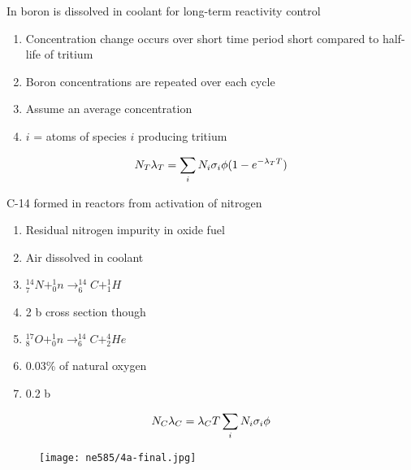 \documentclass[aspectratio=1610,pdftex,dvipsnames,compress,xcolor={dvipsnames}]{beamer}
\newcommand{\acsp}{\acrshortpl} %
\begin{document}
\begin{frame}{In \acsp{pwr} boron is dissolved in coolant for long-term reactivity control}
    \begin{enumerate}[series=outerlist,topsep=0pt,itemsep=21pt,leftmargin=*,label=(\arabic*)]
        \item[]Concentration change occurs over short time period short compared to half-life of tritium
        \item[]Boron concentrations are repeated over each cycle
        \item[]Assume an average concentration
        \item[]$i$ = atoms of species $i$ producing tritium
    \end{enumerate}
    
    \vspace*{\fill}

    \begin{equation}
        \LARGE
        N_T\lambda_T=\sum_i N_i\sigma_i\phi(1-e^{-\lambda_T T})
    \end{equation}
\end{frame}


\begin{frame}{C-14 formed in reactors from activation of nitrogen}
    \begin{enumerate}[series=outerlist,topsep=0pt,itemsep=11pt,leftmargin=*,label=(\arabic*)]
        \item[]Residual nitrogen impurity in oxide fuel
        \item[]Air dissolved in coolant
        \item[]$^{14}_7N+^1_0n \rightarrow ^{14}_6C+^1_1H$ 
        \item[]2 b cross section though
        \item[]$^{17}_8O+^1_0n \rightarrow ^{14}_6C+^4_2He$
        \item[]0.03\% of natural oxygen
        \item[]0.2 b 
    \end{enumerate}
    
    \vspace*{\fill}

    \begin{equation}
        \LARGE
        N_C\lambda_C=\lambda_CT\sum_i N_i \sigma_i \phi
    \end{equation}
\end{frame}


\begin{frame}[plain]{}
    \begin{figure}
        \centering
        \texttt{[image: ne585/4a-final.jpg]}
    \end{figure}
\end{frame}
\end{document}
